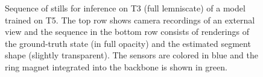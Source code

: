 \begin{figure}[hbt]
  \hfill
  \caption{Sequence of stills for inference on T3 (full lemniscate) of a model trained on T5. The top row shows camera recordings of an external view and the sequence in the bottom row consists of renderings of the ground-truth state (in full opacity) and the estimated segment shape (slightly transparent). The sensors are colored in blue and the ring magnet integrated into the backbone is shown in green.}
  \label{fig:promasens:experiment_sequences}
\end{figure}



        


